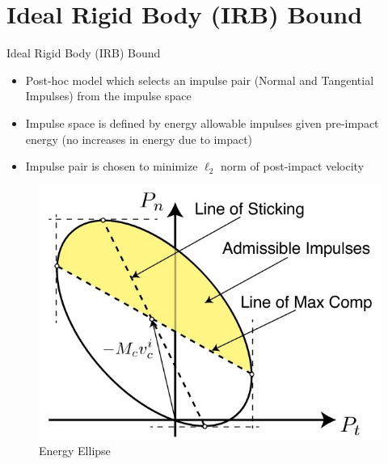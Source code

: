 \section{Ideal Rigid Body (IRB) Bound}

\begin{frame}{Ideal Rigid Body (IRB) Bound}
\begin{itemize}
    \item Post-hoc model which selects an impulse pair (Normal and Tangential Impulses) from the impulse space
    \item Impulse space is defined by energy allowable impulses given pre-impact energy (no increases in energy due to impact)
    \item Impulse pair is chosen to minimize $\ell_2$ norm of post-impact velocity
\end{itemize}     
     \begin{figure}
        \centering
        \includegraphics[scale=0.6]{figures/energyEllipse.jpg}
        \caption{Energy Ellipse\cite{nima2}}
        \label{fig:energyEllipse}
\end{figure}

\end{frame}

